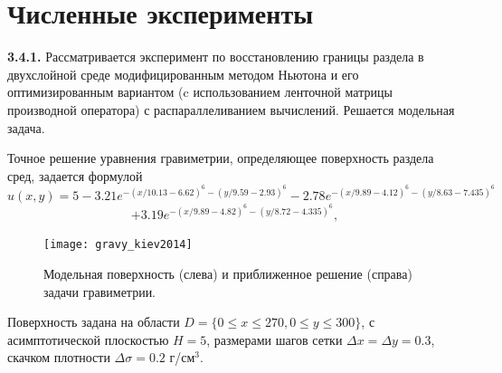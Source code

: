 \newpage
\section{Численные эксперименты}

{\bfseries 3.4.1.} Рассматривается эксперимент по восстановлению границы раздела в двухслойной среде модифицированным методом Ньютона и его оптимизированным вариантом (c использованием ленточной матрицы производной оператора) с распараллеливанием вычислений. Решается модельная задача.

Точное решение уравнения гравиметрии, определяющее поверхность раздела сред, задается формулой
$$\hat{u}(x,y)=5-3.21e^{-(x/10.13-6.62)^6-(y/9.59-2.93)^6}-2.78e^{-(x/9.89-4.12)^6-(y/8.63-7.435)^6}$$ 
\begin{equation}\label{exact_exp3.4.1}
+3.19e^{-(x/9.89-4.82)^6-(y/8.72-4.335)^6},
\end{equation}
\begin{figure}
	\centering
	\texttt{[image: gravy\_kiev2014]}
	\caption{Модельная поверхность (слева) и приближенное решение (справа) задачи гравиметрии.}
	\label{fig:gravy_kiev2014}
\end{figure}
Поверхность задана на области $D=\{0\le x\le 270, 0\le y\le 300\}$, с асимптотической плоскостью $H=5$, размерами шагов сетки $\Delta x=\Delta y=0.3$, скачком плотности $\Delta\sigma=0.2$ г/см$^3$.

